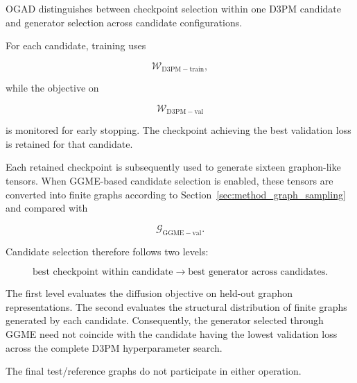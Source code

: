 OGAD distinguishes between checkpoint selection within one D3PM candidate and generator selection across candidate configurations.

For each candidate, training uses

\[
\mathcal{W}_{\mathrm{D3PM-train}},
\]

while the objective on

\[
\mathcal{W}_{\mathrm{D3PM-val}}
\]

is monitored for early stopping. The checkpoint achieving the best validation loss is retained for that candidate.

Each retained checkpoint is subsequently used to generate sixteen graphon-like tensors. When GGME-based candidate selection is enabled, these tensors are converted into finite graphs according to Section~\ref{sec:method_graph_sampling} and compared with

\[
\mathcal{G}_{\mathrm{GGME-val}}.
\]

Candidate selection therefore follows two levels:

\[
\text{best checkpoint within candidate}
\longrightarrow
\text{best generator across candidates}.
\]

The first level evaluates the diffusion objective on held-out graphon representations. The second evaluates the structural distribution of finite graphs generated by each candidate. Consequently, the generator selected through GGME need not coincide with the candidate having the lowest validation loss across the complete D3PM hyperparameter search.

The final test/reference graphs do not participate in either operation.

